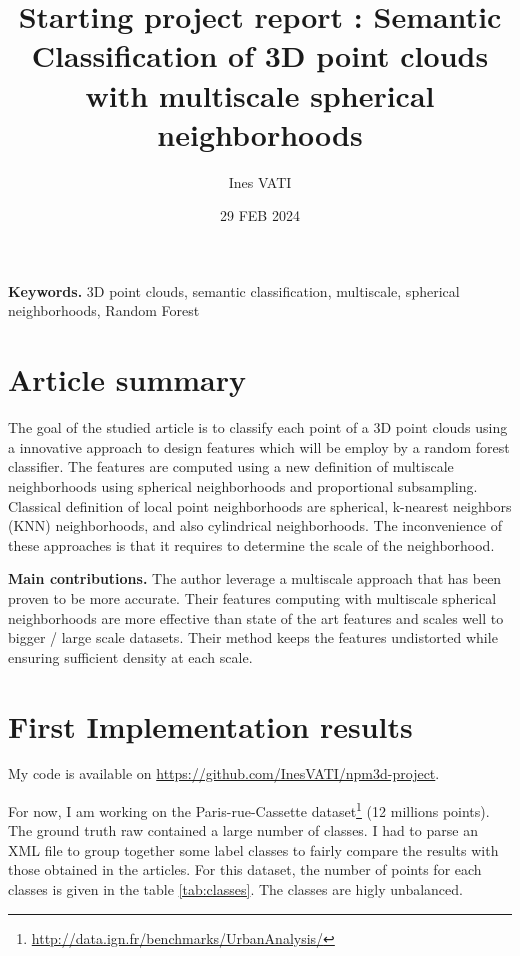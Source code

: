\documentclass[a4paper, 11pt]{article}
\title{Starting project report : Semantic Classification of 3D point clouds with multiscale spherical neighborhoods}
\author[1, 2]{Ines VATI}
\affil[1]{École des Ponts ParisTech, Champs-sur-Marne, France}
\affil[2]{MVA, ENS Paris-Saclay, Cachan, France}
\affil[1, 2]{Email \email{ines.vati@eleves.enpc.fr}}
\date{29 FEB 2024}
\begin{document}
\maketitle
    
\textbf{Keywords. } 3D point clouds, semantic classification, multiscale, spherical neighborhoods, Random Forest

\section{Article summary}
The goal of the studied article \cite{thomas_semantic_2018} is to classify each point of a 3D point clouds using a innovative approach to design features which will be employ by a random forest classifier. 
The features are computed using a new definition of multiscale neighborhoods using spherical neighborhoods and proportional subsampling. 
Classical definition of local point neighborhoods are spherical, k-nearest neighbors (KNN) neighborhoods, and also cylindrical neighborhoods. The inconvenience of these approaches is that it requires to determine the scale of the neighborhood.

\textbf{Main contributions. } The author leverage a multiscale approach that has been proven to be more accurate. Their features computing with multiscale spherical neighborhoods are more effective than state of the art features and scales well to bigger / large scale datasets. Their method keeps the features undistorted while ensuring sufficient density at each scale.

\section{First Implementation results}
My code is available on \url{https://github.com/InesVATI/npm3d-project}.

For now, I am working on the Paris-rue-Cassette dataset\footnote{\url{http://data.ign.fr/benchmarks/UrbanAnalysis/}} (12 millions points). The ground truth raw contained a large number of classes. I had to parse an XML file to group together some label classes to fairly compare the results with those obtained in the articles. For this dataset, the number of points for each classes is given in the table \ref{tab:classes}. The classes are higly unbalanced.
\end{document}
